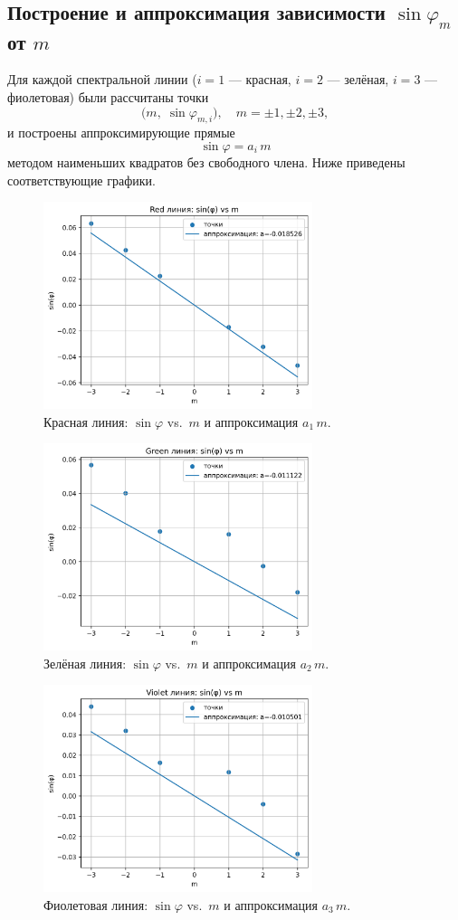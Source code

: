 \subsection{Построение и аппроксимация зависимости \(\sin\varphi_m\) от \(m\)}

Для каждой спектральной линии (\(i=1\) — красная, \(i=2\) — зелёная, \(i=3\) — фиолетовая) были рассчитаны точки
\[
	\bigl(m,\;\sin\varphi_{m,i}\bigr),
	\quad m=\pm1,\pm2,\pm3,
\]
и построены аппроксимирующие прямые
\[
	\sin\varphi = a_i\,m
\]
методом наименьших квадратов без свободного члена. Ниже приведены соответствующие графики.

\begin{figure}[H]
	\centering
	\includegraphics[width=0.7\textwidth]{images/red_fit.png}
	\caption{Красная линия: \(\sin\varphi\) vs.\ \(m\) и аппроксимация \(a_1\,m\).}
	\label{fig:sinphi-red}
\end{figure}

\begin{figure}[H]
	\centering
	\includegraphics[width=0.7\textwidth]{images/green_fit.png}
	\caption{Зелёная линия: \(\sin\varphi\) vs.\ \(m\) и аппроксимация \(a_2\,m\).}
	\label{fig:sinphi-green}
\end{figure}

\begin{figure}[H]
	\centering
	\includegraphics[width=0.7\textwidth]{images/violet_fit.png}
	\caption{Фиолетовая линия: \(\sin\varphi\) vs.\ \(m\) и аппроксимация \(a_3\,m\).}
	\label{fig:sinphi-violet}
\end{figure}
